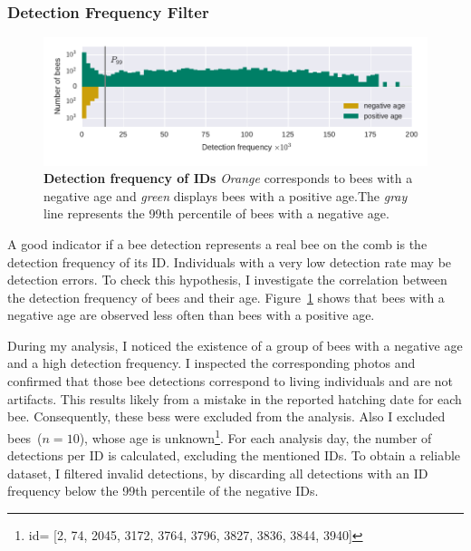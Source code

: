\subsubsection{Detection Frequency Filter}
\label{subsubsec:dataset:filter}
\begin{figure}[t]
	\centering
	\includegraphics[width=1.0\textwidth]{Figures/filter}
	\caption[Detection frequency of IDs]{\textbf{Detection frequency of IDs} \emph{Orange} corresponds to bees with a negative age and \emph{green} displays bees with a positive age.\protect\footnotemark The \emph{gray} line represents the 99th percentile of bees with a negative age.}
	\label{fig:filter}
\end{figure}

A good indicator if a bee detection represents a real bee on the comb is the detection frequency of its ID.
Individuals with a very low detection rate may be detection errors.
To check this hypothesis, I investigate the correlation between the detection frequency of bees and their age.
Figure~\ref{fig:filter} shows that bees with a negative age are
observed less often than bees with a positive age.

During my analysis, I noticed the existence of a group of bees with a negative age and a high detection frequency.
I inspected the corresponding photos and confirmed that those bee detections correspond to living individuals and are not artifacts.
This results likely from a mistake in the reported hatching date for each bee.
Consequently, these bess were excluded from the analysis. Also I excluded bees~($n=10$), whose age is unknown\footnote{id= [2,
    74,
    2045,
    3172,
    3764,
    3796,
    3827,
    3836,
    3844,
    3940]}.
For each analysis day, the number of detections per ID is calculated, excluding the mentioned IDs.
To obtain a reliable dataset, I filtered invalid detections, by discarding all detections with an ID frequency below the 99th percentile of the negative IDs.



